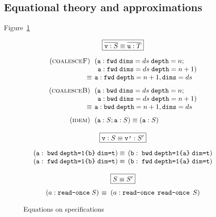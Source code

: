 \documentclass[9pt]{sigplanconf}
\theoremstyle{definition}
\begin{document}
\subsection{Equational theory and approximations}
\label{sec:eqs}

Figure~\ref{fig:equations}

\begin{figure}
\begin{align*}
\hspace{-1em}
\setlength{\arraycolsep}{0.05em}
\begin{array}{c}
\framebox{$\overline{\texttt{v} : S} \equiv \overline{\texttt{u} : T}$} \\[1em]
\begin{array}{rl}
(\textsc{coalesceF}) \;\; & (\texttt{a} : \texttt{fwd} \;
                       \texttt{dims}=ds \; \texttt{depth}=n; \\
&  \;\, \texttt{a} :  \texttt{fwd} \; \texttt{dims}=ds \; \texttt{depth}=n+1)\\
\equiv \; & \texttt{a} :  \texttt{fwd} \; \texttt{depth}=n+1,
         \texttt{dims}=ds \\[0.75em]
(\textsc{coalesceB}) \;\; & (\texttt{a} : \texttt{bwd} \;
                       \texttt{dims}=ds \; \texttt{depth}=n; \\
&  \;\, \texttt{a} :  \texttt{bwd} \; \texttt{dims}=ds \; \texttt{depth}=n+1) \\
\equiv \; & \texttt{a} :  \texttt{bwd} \; \texttt{depth}=n+1,
         \texttt{dims}=ds \\[0.75em]
(\textsc{idem}) \;\; & (\texttt{a} : S; \texttt{a} : S) \equiv (\texttt{a}
                  : S)
\end{array} \\ \\
\framebox{$\texttt{v} : S \equiv \texttt{v'} : S'$} \\[1em]
\begin{array}{ll}
(\texttt{a} : \; \texttt{bwd} \; \texttt{depth=1\{b\}} \;
  \texttt{dim=t})
\, & \equiv \,
(\texttt{b} : \; \texttt{bwd} \; \texttt{depth=1\{a\}} \;
  \texttt{dim=t})
\\ 
(\texttt{a} : \; \texttt{fwd} \; \texttt{depth=1\{b\}}\;
  \texttt{dim=t})
\, & \equiv \,
(\texttt{b} : \; \texttt{fwd} \; \texttt{depth=1\{a\}} \;
  \texttt{dim=t})
\end{array}
\\ \\
\framebox{$S \equiv S'$} \\[0.75em]
\begin{array}{ll}
(a : \texttt{read-once} \; S) \; & \equiv \; (a : \texttt{read-once} \;\,
  \texttt{read-once} \; \, S)
\end{array}
\end{array}
\end{align*}
\caption{Equations on specifications}
\label{fig:equations}
\end{figure}
\end{document}
